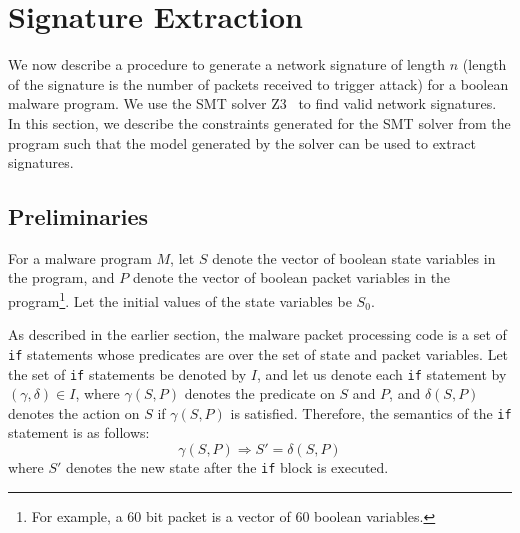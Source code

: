 \documentclass[]{article}
\begin{document}
\section{Signature Extraction} \label{sec:extraction}
We now describe a procedure to generate a network signature
of length $n$ (length of the signature is the number of packets
received to trigger attack) for a boolean malware program. 
We use the SMT solver Z3~\cite{z3}
to find valid network signatures. In this section, we describe
the constraints generated for the SMT solver from the program
such that the model generated by the solver can be used to 
extract signatures. 

\subsection{Preliminaries}
For a malware program $M$, let $S$ denote
 the vector of boolean state variables in the program,
  and $P$ denote the vector of boolean packet variables
  in the program\footnote{
  	For example, a 60 bit packet is a vector 
  	of 60 boolean variables.}. Let the
  initial values of the state variables be $S_{0}$.

As described in the earlier section, the malware
packet processing code is a set of \texttt{if} 
statements whose predicates are over the set of state
and packet variables. Let the set of \texttt{if} 
statements be denoted by $I$, and let us denote each \texttt{if} 
statement by $(\gamma, \delta) \in I$, where $\gamma(S,P)$
denotes the predicate on $S$ and $P$, and $\delta(S,P)$ denotes
the action on $S$ if $\gamma(S,P)$ is satisfied. Therefore,
the semantics of the \texttt{if} statement is as follows:
\begin{equation}
\gamma(S,P) \Rightarrow S' = \delta(S,P)
\end{equation}
where $S'$ denotes the new state after the \texttt{if} 
block is executed.
\end{document}
